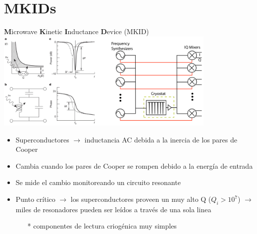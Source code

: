 \documentclass[ignorenonframetext,12pt]{beamer}
\begin{document}
\section{MKIDs}
\begin{frame}{\textbf{M}icrowave \textbf{K}inetic \textbf{I}nductance
				\textbf{D}evice (MKID)}
				\centering
												\qquad \includegraphics[width=0.8\textwidth]{concepto_mkid1}
				\begin{itemize}
								\item \footnotesize{Superconductores $\to$ inductancia AC debida a la
												inercia de los pares de Cooper}
								\item Cambia cuando los pares de Cooper se rompen debido a la
												energía de entrada
								\item Se mide el cambio monitoreando un circuito resonante
								\item Punto crítico $\to$ los \alert{superconductores proveen un muy
												alto Q} ($Q_i > 10^7$) $\to$ miles de resonadores
												pueden ser leídos a través de una sola linea 
												\begin{itemize}
																\item[*] \scriptsize{{\color{blue}componentes de lectura criogénica muy
																				simples}}
												\end{itemize}
				\end{itemize}

\end{frame}
\end{document}
